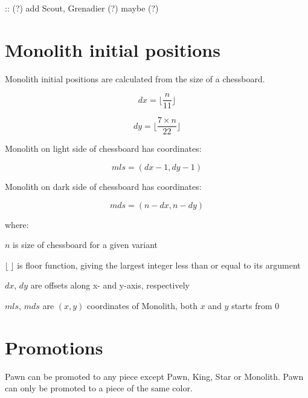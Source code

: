 \TODO :: (?) add Scout, Grenadier (?) maybe (?)

\clearpage %

\section*{Monolith initial positions}
\label{sec:Definitions/Monolith initial positions}

Monolith initial positions are calculated from the size of a chessboard.

\begin{equation}
dx = \lfloor \frac{n}{11} \rfloor
\end{equation}

\begin{equation}
dy = \lfloor \frac{7 \times n}{22} \rfloor
\end{equation}

Monolith on light side of chessboard has coordinates:

\begin{equation}
mls = (dx - 1, dy - 1)
\end{equation}

Monolith on dark side of chessboard has coordinates:

\begin{equation}
mds = (n - dx, n - dy)
\end{equation}

where:

$n$ is size of chessboard for a given variant

$\lfloor\ \rfloor$ is floor function, giving the largest integer less than or equal to its argument

$dx$, $dy$ are offsets along x- and y-axis, respectively

$mls$, $mds$ are $(x, y)$ coordinates of Monolith, both $x$ and $y$ starts from $0$

\clearpage %

\section*{Promotions}
\label{sec:Definitions/Promotions}

Pawn can be promoted to any piece except Pawn, King, Star or Monolith.
Pawn can only be promoted to a piece of the same color.

